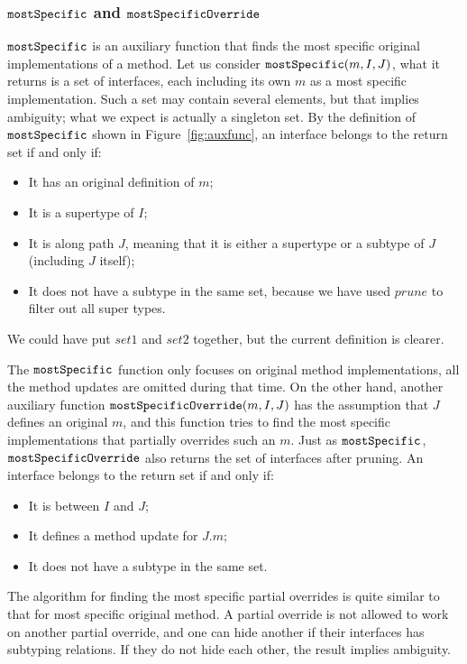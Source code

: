 \subsubsection{$\texttt{mostSpecific}$ and $\texttt{mostSpecificOverride}$}

$\texttt{mostSpecific}$ is an auxiliary function that finds the most specific original implementations of a method. Let us consider $\texttt{mostSpecific}(m, I, J)$, what it returns is a set of interfaces, each including its own $m$ as a most specific implementation. Such a set may contain several elements, but that implies ambiguity; what we expect is actually a singleton set. By the definition of $\texttt{mostSpecific}$ shown in Figure~\ref{fig:auxfunc}, an interface belongs to the return set if and only if:
\begin{itemize}
	\item It has an original definition of $m$;
	\item It is a supertype of $I$;
	\item It is along path $J$, meaning that it is either a supertype or a subtype of $J$ (including $J$ itself);
	\item It does not have a subtype in the same set, because we have used $prune$ to filter out all super types.
\end{itemize}
We could have put $set1$ and $set2$ together, but the current
definition is clearer.

The $\texttt{mostSpecific}$ function only focuses on original method implementations, all the method updates are omitted during that time. On the other hand, another auxiliary function $\texttt{mostSpecificOverride}(m, I, J)$ has the assumption that $J$ defines an original $m$, and this function tries to find the most specific implementations that partially overrides such an $m$. Just as $\texttt{mostSpecific}$, $\texttt{mostSpecificOverride}$ also returns the set of interfaces after pruning. An interface belongs to the return set if and only if:
\begin{itemize}
	\item It is between $I$ and $J$;
	\item It defines a method update for $J.m$;
	\item It does not have a subtype in the same set.
\end{itemize}
The algorithm for finding the most specific partial overrides is quite similar to that for most specific original method. A partial override is not allowed to work on another partial override, and one can hide another if their interfaces has subtyping relations. If they do not hide each other, the result implies ambiguity.

